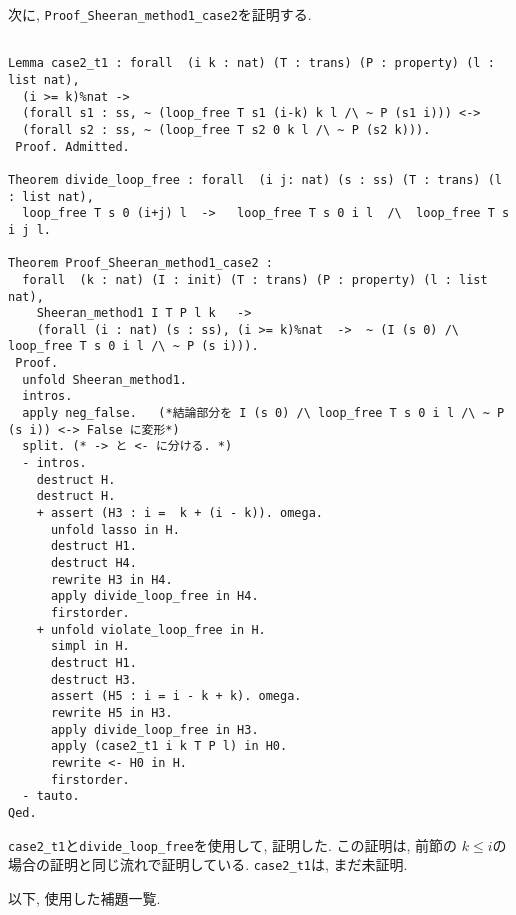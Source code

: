 \documentclass{jsarticle}
\begin{document}
次に, \texttt{Proof\_Sheeran\_method1\_case2}を証明する.
\begin{lstlisting}[language = Coq,  frame=tb, framesep=5pt, breaklines = true] % path

Lemma case2_t1 : forall  (i k : nat) (T : trans) (P : property) (l : list nat),
  (i >= k)%nat ->
  (forall s1 : ss, ~ (loop_free T s1 (i-k) k l /\ ~ P (s1 i))) <->  
  (forall s2 : ss, ~ (loop_free T s2 0 k l /\ ~ P (s2 k))).
 Proof. Admitted. 
 
Theorem divide_loop_free : forall  (i j: nat) (s : ss) (T : trans) (l : list nat),
  loop_free T s 0 (i+j) l  ->   loop_free T s 0 i l  /\  loop_free T s i j l.
  
Theorem Proof_Sheeran_method1_case2 :
  forall  (k : nat) (I : init) (T : trans) (P : property) (l : list nat),
    Sheeran_method1 I T P l k   ->   
    (forall (i : nat) (s : ss), (i >= k)%nat  ->  ~ (I (s 0) /\ loop_free T s 0 i l /\ ~ P (s i))).
 Proof.
  unfold Sheeran_method1.
  intros.
  apply neg_false.   (*結論部分を I (s 0) /\ loop_free T s 0 i l /\ ~ P (s i)) <-> False に変形*)
  split. (* -> と <- に分ける. *)
  - intros.
    destruct H.
    destruct H.
    + assert (H3 : i =  k + (i - k)). omega.
      unfold lasso in H.
      destruct H1.
      destruct H4.
      rewrite H3 in H4.
      apply divide_loop_free in H4. 
      firstorder.
    + unfold violate_loop_free in H.
      simpl in H.
      destruct H1.
      destruct H3.
      assert (H5 : i = i - k + k). omega.
      rewrite H5 in H3.   
      apply divide_loop_free in H3.
      apply (case2_t1 i k T P l) in H0.
      rewrite <- H0 in H.
      firstorder.
  - tauto.
Qed.        
\end{lstlisting}
\texttt{case2\_t1}と\texttt{divide\_loop\_free}を使用して, 証明した. 
この証明は, 前節の $k \leq i$の場合の証明と同じ流れで証明している. 
\texttt{case2\_t1}は, まだ未証明. 

\newpage

以下, 使用した補題一覧. 
\end{document}
